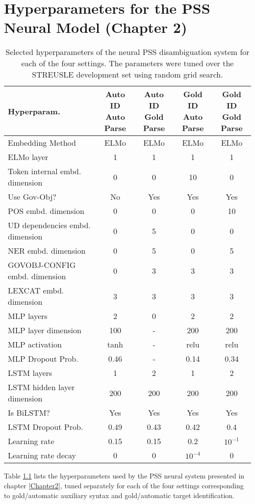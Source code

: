 
\chapter{Hyperparameters for the PSS Neural Model (Chapter 2)} %

\label{AppendixA} %

\begin{table}[h]
  \small
	\centering
	\begin{tabular}{@{}l|cccc@{}}
		\toprule
		Hyperparam. & \thead{Auto ID\\Auto Parse} & \thead{Auto ID\\Gold Parse} & \thead{Gold ID\\Auto Parse} & \thead{Gold ID\\Gold Parse}\\
		\midrule
        Embedding Method & ELMo & ELMo & ELMo & ELMo \\
        ELMo layer & 1 & 1 & 1 & 1 \\
        Token internal embd. dimension & 0 & 0 & 10 & 0 \\
        Use Gov-Obj? & No & Yes & Yes & Yes \\
        POS embd. dimension  & 0 & 0 & 0 & 10 \\
        UD dependencies embd. dimension  & 0 & 5 & 0 & 0 \\
        NER  embd. dimension  & 0 & 5 & 0 & 5 \\
        GOVOBJ-CONFIG embd. dimension  & 0 & 3 & 3 & 3 \\
        LEXCAT embd. dimension  & 3 & 3 & 3 & 3 \\
        MLP layers  & 2 & 0 & 2 & 2 \\
        MLP layer dimension  & 100 & - & 200 & 200 \\
        MLP activation  & tanh & - & relu & relu \\
        MLP Dropout Prob.  & 0.46 & - & 0.14 & 0.34 \\
        LSTM layers  & 1 & 2 & 1 & 2 \\
        LSTM hidden layer dimension  & 200 & 200 & 200 & 200 \\
        Is BiLSTM? & Yes & Yes & Yes & Yes \\
        LSTM Dropout Prob.  & 0.49 & 0.43 & 0.42 & 0.4 \\
        Learning rate  & 0.15 & 0.15 & 0.2 & $10^{-1}$ \\
        Learning rate decay  & 0 & 0 & $10^{-4}$ & 0 \\
		\bottomrule
	\end{tabular}
	\caption{\label{tab:hyperparamsA}
        Selected hyperparameters of the neural PSS disambiguation system for each of the four settings. The parameters were tuned over the STREUSLE development set using random grid search.
	}

\end{table}

Table \ref{tab:hyperparamsA} lists the hyperparameters used by the
PSS neural system presented in chapter \ref{Chapter2}, tuned separately for each of the four settings corresponding to gold/automatic auxiliary syntax and gold/automatic target identification.

